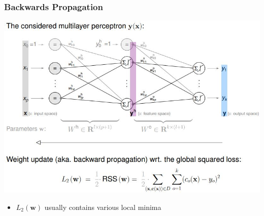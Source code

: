 \documentclass[11pt,a4paper]{article}
\begin{document}
\begin{flushleft}
\subsubsection{Backwards Propagation}
\includegraphics[width=\textwidth]{BackwardProp}
\begin{itemize}
\item $L_2 (\textbf{w})$ usually contains various local minima

\end{itemize}
\end{flushleft}
\end{document}
